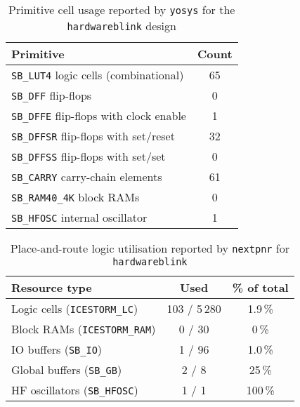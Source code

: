 \documentclass[a4paper,10pt]{article}
\begin{document}
\begin{table}[H]
    \centering
    \begin{tabular}{|l|c|}
        \hline
        \textbf{Primitive} & \textbf{Count} \\
        \hline
        \texttt{SB\_LUT4} logic cells (combinational) & 65 \\ %
        \texttt{SB\_DFF} flip-flops & 0 \\
        \texttt{SB\_DFFE} flip-flops with clock enable & 1 \\
        \texttt{SB\_DFFSR} flip-flops with set/reset & 32 \\
        \texttt{SB\_DFFSS} flip-flops with set/set & 0 \\
        \texttt{SB\_CARRY} carry-chain elements & 61 \\
        \texttt{SB\_RAM40\_4K} block RAMs & 0 \\
        \texttt{SB\_HFOSC} internal oscillator & 1 \\
        \hline
    \end{tabular}
    \caption{Primitive cell usage reported by 
    \texttt{yosys} for the \texttt{hardwareblink} design}
    \label{tab:hardware_yosys_report}
\end{table}

\begin{table}[H]
    \centering
    \begin{tabularx}{0.6\textwidth}{X c c}
        \toprule
        Resource type & Used & \% of total \\ \midrule
        Logic cells (\texttt{ICESTORM\_LC}) & 103 / 5\,280 & 1.9\,\% \\
        Block RAMs (\texttt{ICESTORM\_RAM}) & 0 / 30 & 0\,\% \\
        IO buffers (\texttt{SB\_IO}) & 1 / 96 & 1.0\,\% \\
        Global buffers (\texttt{SB\_GB}) & 2 / 8  & 25\,\% \\
        HF oscillators (\texttt{SB\_HFOSC}) & 1 / 1  & 100\,\% \\ 
    \bottomrule
    \end{tabularx}
    \caption{Place-and-route logic utilisation reported by 
    \texttt{nextpnr} for \texttt{hardwareblink}}
    \label{tab:hardware_pnr_report}
\end{table}
\end{document}
